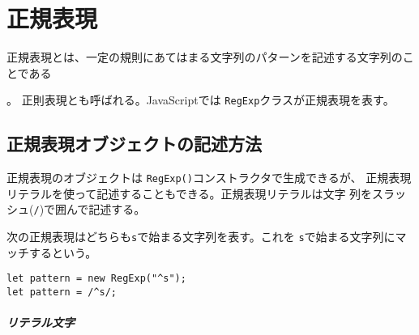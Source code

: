 \chapter{正規表現}\label{regEx}
正規表現とは、一定の規則にあてはまる文字列のパターンを記述する文字列のこ
とである
\iffalse%
同等のものであったが、最近の計算機言語で取り扱う正則言語は機能が拡張され、
正則言語より広い範囲の形式言語を記述することが可能となっている。}
\fi
。
正則表現とも呼ばれる。JavaScriptでは
\texttt{RegExp}クラスが正規表現を表す。
\section{正規表現オブジェクトの記述方法}
正規表現のオブジェクトは \texttt{RegExp()}コンストラクタで生成できるが、
正規表現リテラルを使って記述することもできる。正規表現リテラルは文字
列をスラッシュ(\texttt{/})で囲んで記述する。

次の正規表現はどちらも\texttt{s}で始まる文字列を表す。これを
\texttt{s}で始まる文字列にマッチするという。
\begin{Verbatim}
let pattern = new RegExp("^s");
let pattern = /^s/;
\end{Verbatim}
\iffalse%
正規表現内の文字には通常の文
字(ここでは\texttt{s})を表すものと、特別な意味を持つ文字(ここでは
\Verb+^+)がある。特別な意味を持つ文字はメタ文字と呼ばれる。
\fi
\paragraph{リテラル文字}

